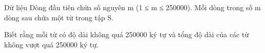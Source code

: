 Dữ liệu
Dòng đầu tiên chứa số nguyên m (1 ≤ m ≤ 250000). Mỗi dòng trong số m dòng sau chứa một từ trong tập S.  

   Biết rằng mỗi từ có độ dài không quá 250000 ký tự và tổng độ dài của các từ không vượt quá 250000 ký tự.
